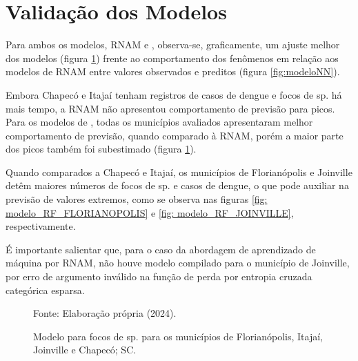 \section{Validação dos Modelos}

\indent Para ambos os modelos, \acrshort{RNAM} e , observa-se, graficamente, um ajuste melhor dos modelos  (figura \ref{fig:modeloRF}) frente ao comportamento dos fenômenos em relação aos modelos de \acrshort{RNAM} entre valores observados e preditos (figura \ref{fig:modeloNN}).

\indent Embora Chapecó e Itajaí tenham registros de casos de dengue e focos de  sp. há mais tempo, a \acrshort{RNAM} não apresentou comportamento de previsão para picos. Para os modelos de , todas os municípios avaliados apresentaram melhor comportamento de previsão, quando comparado à \acrshort{RNAM}, porém a maior parte dos picos também foi subestimado (figura \ref{fig:modeloRF}). 

\indent Quando comparados a Chapecó e Itajaí, os municípios de Florianópolis e Joinville detêm maiores números de focos de  sp. e casos de dengue, o que pode auxiliar na previsão de valores extremos, como se observa nas figuras \ref{fig: modelo_RF_FLORIANOPOLIS} e \ref{fig: modelo_RF_JOINVILLE}, respectivamente.

\indent É importante salientar que, para o caso da abordagem de aprendizado de máquina por \acrshort{RNAM}, não houve modelo compilado para o município de Joinville, por erro de argumento inválido na função de perda por entropia cruzada categórica esparsa. 

\begin{figure}[htbp]
    \begin{center}
    \caption{Modelo  para focos de  sp. para os municípios de Florianópolis, Itajaí, Joinville e Chapecó; \acrlong{SC}.}
    \label{fig:modeloRF}
    \hfill
    \hfill
    \end{center}
    \small{Fonte: Elaboração própria (2024).}
\end{figure}

